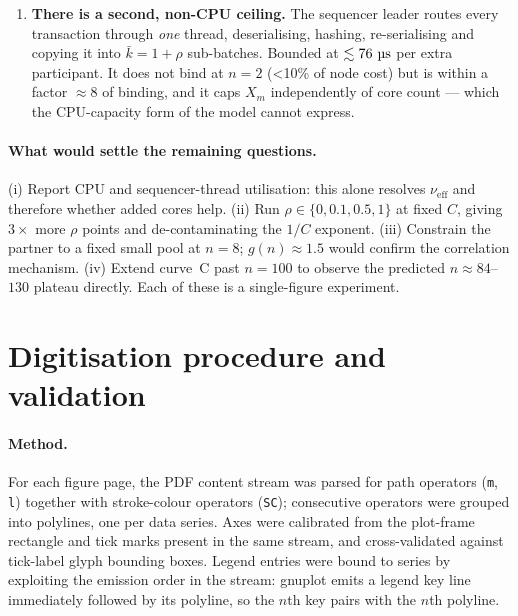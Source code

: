 \documentclass[11pt,a4paper]{article}
\newcommand{\hot}{C}
\newcommand{\pernode}{X_m}
\newcommand{\msecs}{\ensuremath{\,\text{\textmu}\text{s}}}
\newcommand{\nueff}{\ensuremath{\nu_{\mathrm{eff}}}}
\newcommand{\gRatio}{g(n)}
\begin{document}
\begin{enumerate}[leftmargin=1.6em,itemsep=3pt]
      explaining why the $\hot=10^{-2}$ plateau has not been reached at $n=100$ ---
      but that exponent is estimated from only two contention levels and is
      partly confounded with the $\rho$ non-linearity above. Treat it as
      descriptive.
\item \textbf{There is a second, non-CPU ceiling.} The sequencer leader routes
      every transaction through \emph{one} thread, deserialising, hashing,
      re-serialising and copying it into $\bar k = 1+\rho$ sub-batches. Bounded at
      $\lesssim\SI{76}{\msecs}$ per extra participant. It does not bind at
      $n=2$ (<10\% of node cost) but is within a factor $\approx8$ of binding,
      and it caps $\pernode$ independently of core count --- which the
      CPU-capacity form of the model cannot express.
\end{enumerate}

\paragraph{What would settle the remaining questions.} (i) Report CPU and
sequencer-thread utilisation: this alone resolves $\nueff$ and therefore whether
added cores help. (ii) Run $\rho\in\{0,0.1,0.5,1\}$ at fixed $\hot$, giving
$3\times$ more $\rho$ points and de-contaminating the $1/\hot$ exponent.
(iii) Constrain the partner to a fixed small pool at $n=8$; $\gRatio\approx1.5$
would confirm the correlation mechanism. (iv) Extend curve~C past $n=100$ to
observe the predicted $n\approx84$--$130$ plateau directly. Each of these is a
single-figure experiment.

\appendix
\section{Digitisation procedure and validation}
\label{app:method}

\paragraph{Method.} For each figure page, the PDF content stream was parsed for
path operators (\texttt{m}, \texttt{l}) together with stroke-colour operators
(\texttt{SC}); consecutive operators were grouped into polylines, one per data
series. Axes were calibrated from the plot-frame rectangle and tick marks
present in the same stream, and cross-validated against tick-label glyph
bounding boxes. Legend entries were bound to series by exploiting the emission
order in the stream: gnuplot emits a legend key line immediately followed by
its polyline, so the $n$th key pairs with the $n$th polyline.
\end{document}
